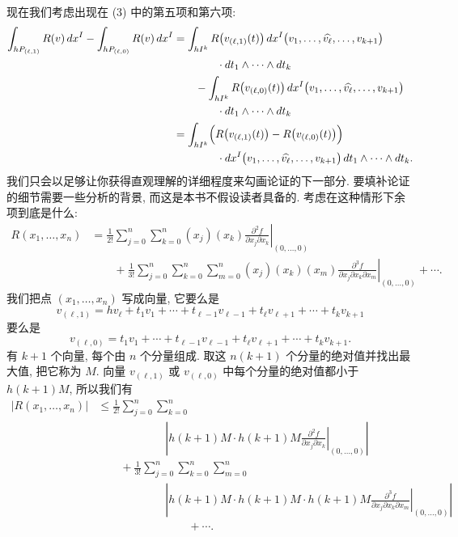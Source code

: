 现在我们考虑出现在 (3) 中的第五项和第六项: 
\begin{align*}
\int_{hP_{(\ell,1)}}R(v)\,dx^I-\int_{hP_{(\ell,0)}}R(v)\,dx^I
&=\int_{hI^k}R\bigl(v_{(\ell,1)}(t)\bigr)\,dx^I\bigl(v_1,\ldots,\widehat{v_\ell},\ldots,v_{k+1}\bigr)\\
&\qquad\qquad\cdot dt_1\wedge\cdots\wedge dt_k\\
&\qquad-\int_{hI^k}R\bigl(v_{(\ell,0)}(t)\bigr)\,dx^I\bigl(v_1,\ldots,\widehat{v_\ell},\ldots,v_{k+1}\bigr)\\
&\qquad\qquad\cdot dt_1\wedge\cdots\wedge dt_k\\
&=\int_{hI^k}\Bigl(R\bigl(v_{(\ell,1)}(t)\bigr)-R\bigl(v_{(\ell,0)}(t)\bigr)\Bigr)\\
&\qquad\qquad\cdot dx^I\bigl(v_1,\ldots,\widehat{v_\ell},\ldots,v_{k+1}\bigr)\,dt_1\wedge\cdots\wedge dt_k.
\end{align*}
我们只会以足够让你获得直观理解的详细程度来勾画论证的下一部分. 要填补论证的细节需要一些分析的背景, 而这是本书不假设读者具备的. 考虑在这种情形下余项到底是什么: 
\[
\begin{aligned}
R(x_1,\ldots,x_n)&=\frac{1}{2!}\sum_{j=0}^{n}\sum_{k=0}^{n}(x_j)(x_k)\left.\frac{\partial^2 f}{\partial x_j\partial x_k}\right|_{(0,\ldots,0)}\\
&\qquad+\frac{1}{3!}\sum_{j=0}^{n}\sum_{k=0}^{n}\sum_{m=0}^{n}(x_j)(x_k)(x_m)\left.\frac{\partial^3 f}{\partial x_j\partial x_k\partial x_m}\right|_{(0,\ldots,0)}+\cdots.
\end{aligned}
\]
我们把点 $(x_1,\ldots,x_n)$ 写成向量, 它要么是
\[
v_{(\ell,1)}=hv_\ell+t_1v_1+\cdots+t_{\ell-1}v_{\ell-1}+t_\ell v_{\ell+1}+\cdots+t_k v_{k+1}
\]
要么是
\[
v_{(\ell,0)}=t_1v_1+\cdots+t_{\ell-1}v_{\ell-1}+t_\ell v_{\ell+1}+\cdots+t_k v_{k+1}.
\]
有 $k+1$ 个向量, 每个由 $n$ 个分量组成. 取这 $n(k+1)$ 个分量的绝对值并找出最大值, 把它称为 $M$. 向量 $v_{(\ell,1)}$ 或 $v_{(\ell,0)}$ 中每个分量的绝对值都小于 $h(k+1)M$, 所以我们有
\[
\begin{aligned}
\bigl|R(x_1,\ldots,x_n)\bigr|&\leq\frac{1}{2!}\sum_{j=0}^{n}\sum_{k=0}^{n}\\
&\qquad\qquad\qquad\left|h(k+1)M\cdot h(k+1)M\left.\frac{\partial^2 f}{\partial x_j\partial x_k}\right|_{(0,\ldots,0)}\right|\\
&\qquad+\frac{1}{3!}\sum_{j=0}^{n}\sum_{k=0}^{n}\sum_{m=0}^{n}\\
&\qquad\qquad\qquad\left|h(k+1)M\cdot h(k+1)M\cdot h(k+1)M\left.\frac{\partial^3 f}{\partial x_j\partial x_k\partial x_m}\right|_{(0,\ldots,0)}\right|\\
&\qquad\qquad\qquad\qquad+\cdots.
\end{aligned}
\]

